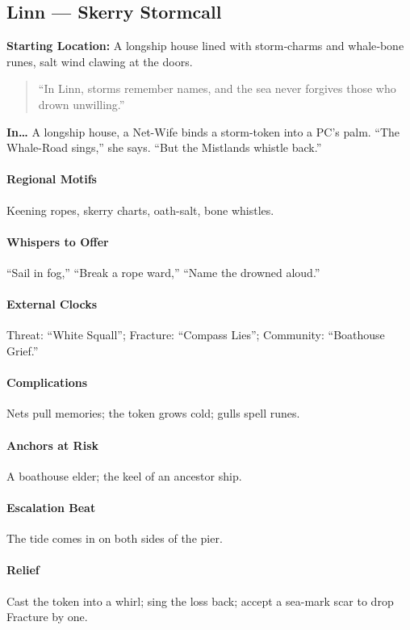     \subsection*{Linn — Skerry Stormcall}
    \textbf{Starting Location:} A longship house lined with storm‑charms and whale‑bone runes, salt wind clawing at the doors.
    \begin{quote}
    “In Linn, storms remember names, and the sea never forgives those who drown unwilling.”
    \end{quote}

    \textbf{In…} A longship house, a Net-Wife binds a storm-token into a PC’s palm. ``The Whale-Road sings,'' she says. ``But the Mistlands whistle back.''
\paragraph{Regional Motifs} Keening ropes, skerry charts, oath-salt, bone whistles.
\paragraph{Whispers to Offer} ``Sail in fog,'' ``Break a rope ward,'' ``Name the drowned aloud.''
\paragraph{External Clocks} Threat: ``White Squall''; Fracture: ``Compass Lies''; Community: ``Boathouse Grief.''
\paragraph{Complications} Nets pull memories; the token grows cold; gulls spell runes.
\paragraph{Anchors at Risk} A boathouse elder; the keel of an ancestor ship.
\paragraph{Escalation Beat} The tide comes in on both sides of the pier.
\paragraph{Relief} Cast the token into a whirl; sing the loss back; accept a sea-mark scar to drop Fracture by one.

